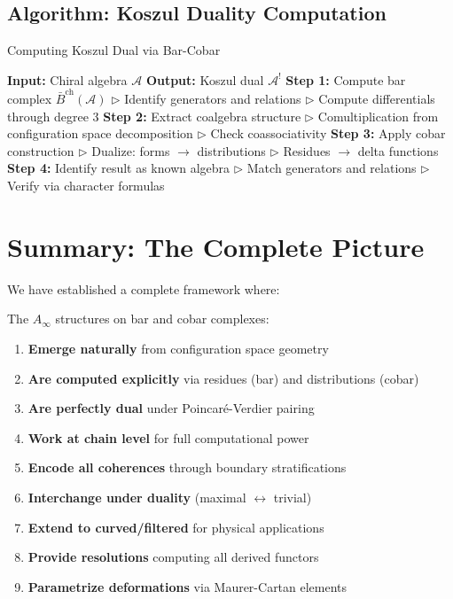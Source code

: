 \subsection{Algorithm: Koszul Duality Computation}


\begin{algorithm}[htbp]
\caption{Computing Koszul Dual via Bar-Cobar}
\begin{algorithmic}[1]
\State \textbf{Input:} Chiral algebra $\mathcal{A}$
\State \textbf{Output:} Koszul dual $\mathcal{A}^!$
\State 
\State \textbf{Step 1:} Compute bar complex $\bar{B}^{\text{ch}}(\mathcal{A})$
\State \quad $\triangleright$ Identify generators and relations
\State \quad $\triangleright$ Compute differentials through degree 3
\State
\State \textbf{Step 2:} Extract coalgebra structure  
\State \quad $\triangleright$ Comultiplication from configuration space decomposition
\State \quad $\triangleright$ Check coassociativity
\State
\State \textbf{Step 3:} Apply cobar construction
\State \quad $\triangleright$ Dualize: forms $\to$ distributions  
\State \quad $\triangleright$ Residues $\to$ delta functions
\State
\State \textbf{Step 4:} Identify result as known algebra
\State \quad $\triangleright$ Match generators and relations
\State \quad $\triangleright$ Verify via character formulas
\end{algorithmic}
\end{algorithm}


\section{Summary: The Complete Picture}

We have established a complete framework where:

\begin{theorem}
The $A_\infty$ structures on bar and cobar complexes:
\begin{enumerate}
\item \textbf{Emerge naturally} from configuration space geometry
\item \textbf{Are computed explicitly} via residues (bar) and distributions (cobar)  
\item \textbf{Are perfectly dual} under Poincaré-Verdier pairing
\item \textbf{Work at chain level} for full computational power
\item \textbf{Encode all coherences} through boundary stratifications
\item \textbf{Interchange under duality} (maximal $\leftrightarrow$ trivial)
\item \textbf{Extend to curved/filtered} for physical applications
\item \textbf{Provide resolutions} computing all derived functors
\item \textbf{Parametrize deformations} via Maurer-Cartan elements
\end{enumerate}
\end{theorem}

